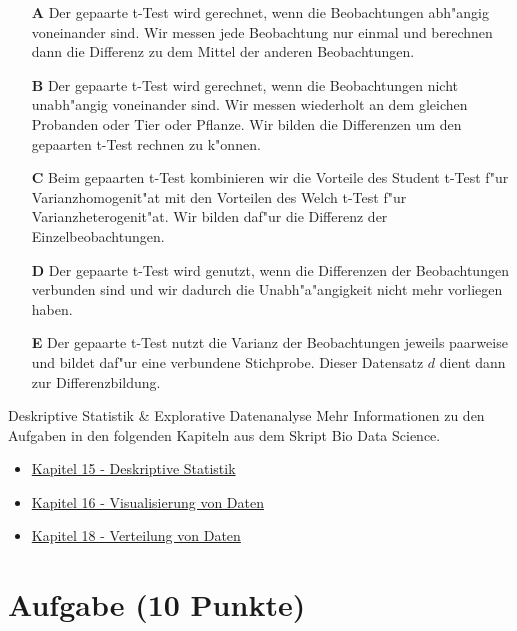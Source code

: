 \documentclass[a4paper, 10pt]{scrartcl}\usepackage[]{graphicx}\usepackage[]{xcolor}
\begin{document}
\begin{enumerate}
\item [\textbf{A} \msquare] Der gepaarte t-Test wird gerechnet, wenn die Beobachtungen abh{"a}ngig voneinander sind. Wir messen jede Beobachtung nur einmal und berechnen dann die Differenz zu dem Mittel der anderen Beobachtungen.
\item [\textbf{B} \msquare] Der gepaarte t-Test wird gerechnet, wenn die Beobachtungen nicht unabh{"a}ngig voneinander sind. Wir messen wiederholt an dem gleichen Probanden oder Tier oder Pflanze. Wir bilden die Differenzen um den gepaarten t-Test rechnen zu k{"o}nnen.
\item [\textbf{C} \msquare] Beim gepaarten t-Test kombinieren wir die Vorteile des Student t-Test f{"u}r Varianzhomogenit{"a}t mit den Vorteilen des Welch t-Test f{"u}r Varianzheterogenit{"a}t. Wir bilden daf{"u}r die Differenz der Einzelbeobachtungen.
\item [\textbf{D} \msquare] Der gepaarte t-Test wird genutzt, wenn die Differenzen der Beobachtungen verbunden sind und wir dadurch die Unabh{"a}{"a}ngigkeit nicht mehr vorliegen haben.
\item [\textbf{E} \msquare] Der gepaarte t-Test nutzt die Varianz der Beobachtungen jeweils paarweise und bildet daf{"u}r eine verbundene Stichprobe. Dieser Datensatz $d$ dient dann zur Differenzbildung.
\end{enumerate}   
\clearpage
\begin{graybox}{Deskriptive Statistik \& Explorative Datenanalyse}
Mehr Informationen zu den Aufgaben in den folgenden Kapiteln aus dem Skript Bio Data Science.
  \begin{itemize}
  \item \href{https://jkruppa.github.io/eda-descriptive.html}{Kapitel 15 - Deskriptive Statistik}
  \item \href{https://jkruppa.github.io/eda-ggplot.html}{Kapitel 16 - Visualisierung von Daten}
  \item \href{https://jkruppa.github.io/eda-distribution.html}{Kapitel 18 - Verteilung von Daten}
  \end{itemize}
\end{graybox}

\section{Aufgabe \hfill (10 Punkte)}
\end{document}
